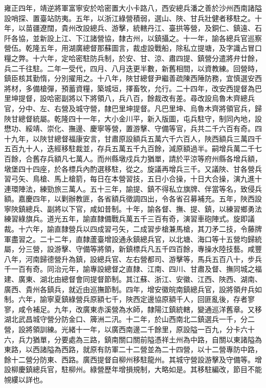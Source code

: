 \begin{pinyinscope}
雍正四年，靖逆將軍富寧安於哈密置大小卡路八，西安總兵潘之善於沙州西南諸隘設哨探、置臺站防夷。五年，以浙江綠營積弱，選山、陜、甘兵壯健者移駐之。十年，以苗疆遼闊，貴州改設總兵、游擊，統轄丹江、臺拱等營，及銅仁、鎮遠、石阡各協，並新設上江、下江諸營協，隸古州，以鎮攝之。十一年，諭各總兵官巡察營伍。乾隆五年，用湖廣總督那蘇圖言，裁虛設戰船，除私立提塘，及字識占冒口糧之弊。十六年，定哈密駐防兵制，於安、甘、涼、肅四提、鎮營分遣將弁廿餘，兵二千往駐。二年一受代，四月、八月迭更半數，新舊相間，以資教練。回營時，鎮臣核其勤惰，分別擢用之。十八年，陜甘總督尹繼善疏陳西陲防務，宜慎選安西將材，多備槍彈，預蓄資糧，築城垣，擇畜牧，允行。二十四年，改安西提督為巴里坤提督，設哈密副將以下將領八，兵八百，餘裁改有差。尋改設烏魯木齊總兵官，分中、左、右營及城守營，隸巴里坤提督。凡巴里坤、烏魯木齊將領官兵，歸陜甘總督統屬。乾隆四十一年，大小金川平，新入版圖，屯兵駐守，制同內地，設懋功、綏靖、崇化、撫邊、慶寧等營，置游擊、守備等官，兵共二千六百有奇。四十九年，以陜甘總督福康安言，甘肅原設額兵五萬六千六百人，陜西額兵三萬四千五百九十人，迭經移駐裁並，存兵五萬五千九百餘，減原額過半。嗣增兵萬二千七百餘，合舊存兵額凡七萬人。而州縣墩戍兵力猶單，請於平涼等府州縣各增兵額，墩堡四十四座，於各標兵內酌選移駐，從之。旋議再增兵三千。又議陜、甘各營兵習弓矢、鳥槍、馬上槍箭，每日在本營習技，五日小合操，十日大合操，演九進十連環陣法，練勁旅三萬人。五十三年，諭提、鎮不得私立旗牌、伴當等名，致侵兵額。嘉慶四年，以剿辦教匪，各省額兵徵調四出，令各省召募補充。五年，陜西設寧陜鎮總兵、副將以下官，咸如昔制。十年，諭各督、撫、提、鎮，以練習鄉勇法練習綠旗兵。道光五年，諭直隸備戰兵萬五千三百有奇，演習車砲陣式。旋即議裁。十六年，諭直隸營兵以四成習弓矢，二成習步槍兼馬槍，其刀矛二技，令藤牌軍盡習之。二十二年，直隸蘆臺增設通永鎮總兵官，以北塘、海口等十五營均歸統屬，分三營，設游擊、守備等將領，新鎮標兵凡五千四百餘，專操水陸技藝。咸豐八年，河南歸德營升為鎮，設總兵官、左右營都司、游擊等，馬兵五百八十，步兵千一百有奇。同治元年，諭專設總督之直隸、江南、四川、甘肅及督、撫同城之福建、廣東、湖北由總督會同提督節制。其江蘇、浙江、安徽、江西、陜西、湖南、廣西、貴州各鎮兵，就近由巡撫節制。四年，增安徽皖南鎮總兵官，設將領弁兵如制。六年，諭寧夏鎮綠營兵原額七千，陜西定邊協原額千人，回匪亂後，存者寥寥，咸令補足。九年，改廣東赤溪營為水師，隸陽江鎮統轄，變通巡洋舊章。又移湖北武昌城守營分防金口、簰洲二汛。十二年，於山西南北二鎮選兵一千，分二營，設將領訓練。光緒十一年，以廣西南邊二千餘里，原設隘一百九，分卡六十六，兵力猶單，分要處為三路，鎮南關口關前隘憑祥土州為中路，自關以東諸隘為東路，以西諸隘為西路，就原有防軍二十二營並為二十四營，以十二營專防中路，餘十二營分防東、西路。廣西提督自柳州移駐龍州。其城守營設游擊及守備等。增設柳慶鎮總兵官，駐柳州。綠營歷年增損規制，大略如是。其移駐編改，節目不能覙縷以詳也。


\end{pinyinscope}
